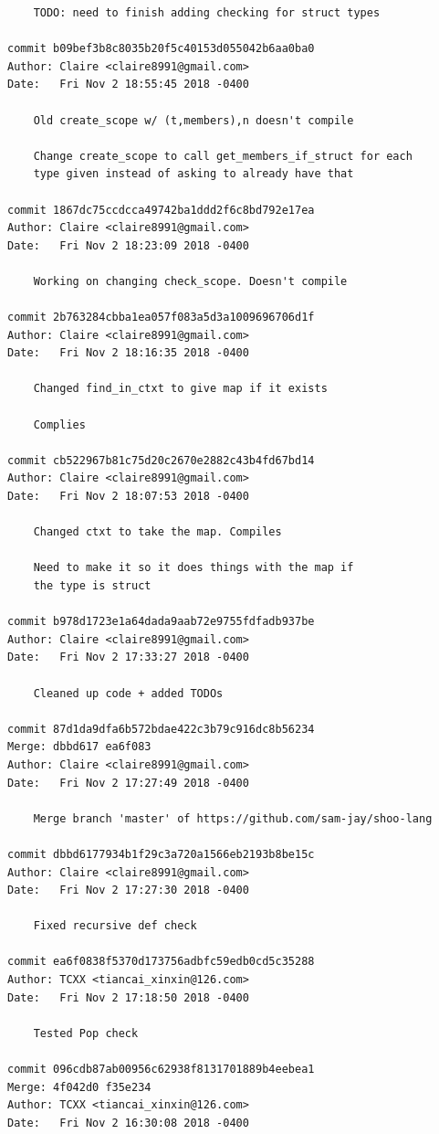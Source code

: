 \documentclass[12pt]{article}
\begin{document}
\begin{lstlisting}
    TODO: need to finish adding checking for struct types

commit b09bef3b8c8035b20f5c40153d055042b6aa0ba0
Author: Claire <claire8991@gmail.com>
Date:   Fri Nov 2 18:55:45 2018 -0400

    Old create_scope w/ (t,members),n doesn't compile
    
    Change create_scope to call get_members_if_struct for each
    type given instead of asking to already have that

commit 1867dc75ccdcca49742ba1ddd2f6c8bd792e17ea
Author: Claire <claire8991@gmail.com>
Date:   Fri Nov 2 18:23:09 2018 -0400

    Working on changing check_scope. Doesn't compile

commit 2b763284cbba1ea057f083a5d3a1009696706d1f
Author: Claire <claire8991@gmail.com>
Date:   Fri Nov 2 18:16:35 2018 -0400

    Changed find_in_ctxt to give map if it exists
    
    Complies

commit cb522967b81c75d20c2670e2882c43b4fd67bd14
Author: Claire <claire8991@gmail.com>
Date:   Fri Nov 2 18:07:53 2018 -0400

    Changed ctxt to take the map. Compiles
    
    Need to make it so it does things with the map if
    the type is struct

commit b978d1723e1a64dada9aab72e9755fdfadb937be
Author: Claire <claire8991@gmail.com>
Date:   Fri Nov 2 17:33:27 2018 -0400

    Cleaned up code + added TODOs

commit 87d1da9dfa6b572bdae422c3b79c916dc8b56234
Merge: dbbd617 ea6f083
Author: Claire <claire8991@gmail.com>
Date:   Fri Nov 2 17:27:49 2018 -0400

    Merge branch 'master' of https://github.com/sam-jay/shoo-lang

commit dbbd6177934b1f29c3a720a1566eb2193b8be15c
Author: Claire <claire8991@gmail.com>
Date:   Fri Nov 2 17:27:30 2018 -0400

    Fixed recursive def check

commit ea6f0838f5370d173756adbfc59edb0cd5c35288
Author: TCXX <tiancai_xinxin@126.com>
Date:   Fri Nov 2 17:18:50 2018 -0400

    Tested Pop check

commit 096cdb87ab00956c62938f8131701889b4eebea1
Merge: 4f042d0 f35e234
Author: TCXX <tiancai_xinxin@126.com>
Date:   Fri Nov 2 16:30:08 2018 -0400


\end{lstlisting}
\end{document}
